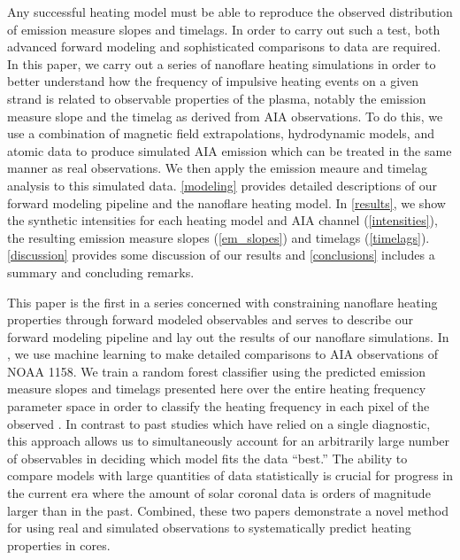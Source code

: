 Any successful heating model must be able to reproduce the observed distribution of emission measure slopes and timelags. In order to carry out such a test, both advanced forward modeling and sophisticated comparisons to data are required. In this paper, we carry out a series of nanoflare heating simulations in order to better understand how the frequency of impulsive heating events on a given strand is related to observable properties of the plasma, notably the emission measure slope and the timelag as derived from AIA observations. To do this, we use a combination of magnetic field extrapolations, hydrodynamic models, and atomic data to produce simulated AIA emission which can be treated in the same manner as real observations. We then apply the emission meaure and timelag analysis to this simulated data. \autoref{modeling} provides detailed descriptions of our forward modeling pipeline and the nanoflare heating model. In \autoref{results}, we show the synthetic intensities for each heating model and AIA channel (\autoref{intensities}), the resulting emission measure slopes (\autoref{em_slopes}) and timelags (\autoref{timelags}). \autoref{discussion} provides some discussion of our results and \autoref{conclusions} includes a summary and concluding remarks.

This paper is the first in a series concerned with constraining nanoflare heating properties through forward modeled observables and serves to describe our forward modeling pipeline and lay out the results of our nanoflare simulations. In \citet[ hereafter]{barnes_understanding_2019-1}, we use machine learning to make detailed comparisons to AIA observations of \AR{} NOAA 1158. We train a random forest classifier using the predicted emission measure slopes and timelags presented here over the entire heating frequency parameter space in order to classify the heating frequency in each pixel of the observed \AR{}. In contrast to past studies which have relied on a single diagnostic, this approach allows us to simultaneously account for an arbitrarily large number of observables in deciding which model fits the data ``best.'' The ability to compare models with large quantities of data statistically is crucial for progress in the current era where the amount of solar coronal data is orders of magnitude larger than in the past.  Combined, these two papers demonstrate a novel method for using real and simulated observations to systematically predict heating properties in \AR{} cores.
